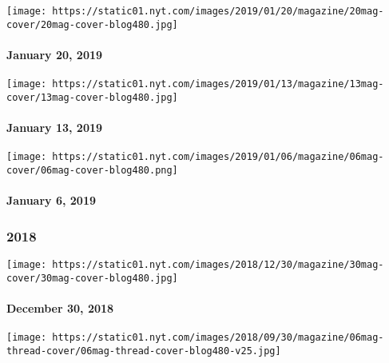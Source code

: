 \href{https://www.nytimes.com/issue/magazine/2019/01/18/the-12019-issue}{}

\texttt{[image: https://static01.nyt.com/images/2019/01/20/magazine/20mag-cover/20mag-cover-blog480.jpg]}

\hypertarget{january-20-2019}{%
\paragraph{January 20, 2019}\label{january-20-2019}}

\href{https://www.nytimes.com/issue/magazine/2019/01/11/the-11318-issue}{}

\texttt{[image: https://static01.nyt.com/images/2019/01/13/magazine/13mag-cover/13mag-cover-blog480.jpg]}

\hypertarget{january-13-2019}{%
\paragraph{January 13, 2019}\label{january-13-2019}}

\href{https://www.nytimes.com/issue/magazine/2019/01/04/the-1619-issue}{}

\texttt{[image: https://static01.nyt.com/images/2019/01/06/magazine/06mag-cover/06mag-cover-blog480.png]}

\hypertarget{january-6-2019}{%
\paragraph{January 6, 2019}\label{january-6-2019}}

\hypertarget{2018}{%
\subsubsection{2018}\label{2018}}

\href{https://www.nytimes.com/interactive/2018/12/27/magazine/lives-they-lived-obituaries.html}{}

\texttt{[image: https://static01.nyt.com/images/2018/12/30/magazine/30mag-cover/30mag-cover-blog480.jpg]}

\hypertarget{december-30-2018}{%
\paragraph{December 30, 2018}\label{december-30-2018}}

\href{https://www.nytimes.com/issue/magazine/2019/01/03/122318-issue}{}

\texttt{[image: https://static01.nyt.com/images/2018/09/30/magazine/06mag-thread-cover/06mag-thread-cover-blog480-v25.jpg]}

